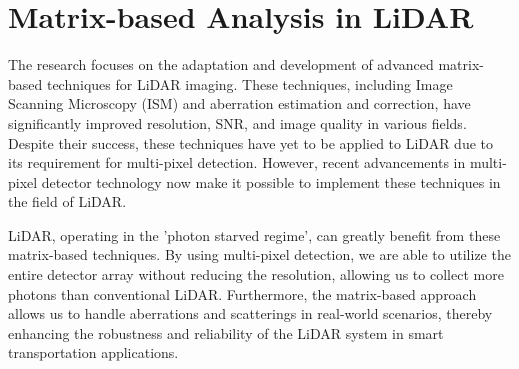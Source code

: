 \documentclass{article}
\begin{document}
\section{Matrix-based Analysis in LiDAR}
The research focuses on the adaptation and development of advanced matrix-based techniques for LiDAR imaging. These techniques, including Image Scanning Microscopy (ISM) and aberration estimation and correction, have significantly improved resolution, SNR, and image quality in various fields. Despite their success, these techniques have yet to be applied to LiDAR due to its requirement for multi-pixel detection. However, recent advancements in multi-pixel detector technology now make it possible to implement these techniques in the field of LiDAR.

LiDAR, operating in the 'photon starved regime', can greatly benefit from these matrix-based techniques. By using multi-pixel detection, we are able to utilize the entire detector array without reducing the resolution, allowing us to collect more photons than conventional LiDAR. Furthermore, the matrix-based approach allows us to handle aberrations and scatterings in real-world scenarios, thereby enhancing the robustness and reliability of the LiDAR system in smart transportation applications.
\end{document}
